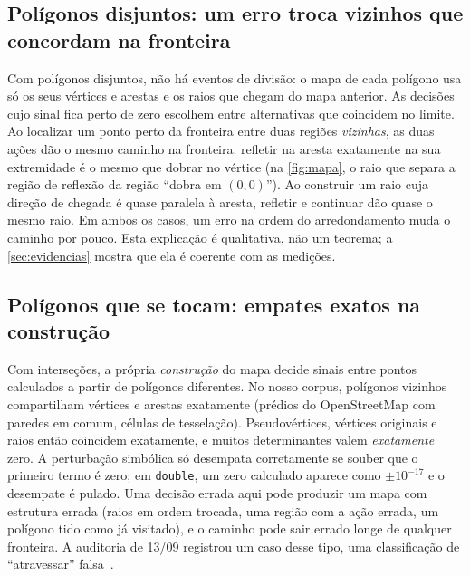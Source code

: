 \documentclass[11pt,a4paper]{article}
\theoremstyle{plain}\newtheorem{proposicao}{Proposição}
\theoremstyle{definition}\newtheorem{definicao}{Definição}
\theoremstyle{plain}\newtheorem{teorema}{Teorema}
\begin{document}
\subsection{Polígonos disjuntos: um erro troca vizinhos que concordam na fronteira}
Com polígonos disjuntos, não há eventos de divisão: o mapa de cada polígono usa só os seus vértices e arestas e os raios que chegam do mapa anterior. As decisões cujo sinal fica perto de zero escolhem entre alternativas que coincidem no limite. Ao localizar um ponto perto da fronteira entre duas regiões \emph{vizinhas}, as duas ações dão o mesmo caminho na fronteira: refletir na aresta exatamente na sua extremidade é o mesmo que dobrar no vértice (na \cref{fig:mapa}, o raio que separa a região de reflexão da região ``dobra em \((0,0)\)''). Ao construir um raio cuja direção de chegada é quase paralela à aresta, refletir e continuar dão quase o mesmo raio. Em ambos os casos, um erro na ordem do arredondamento muda o caminho por pouco. Esta explicação é qualitativa, não um teorema; a \cref{sec:evidencias} mostra que ela é coerente com as medições.

\subsection{Polígonos que se tocam: empates exatos na construção}
Com interseções, a própria \emph{construção} do mapa decide sinais entre pontos calculados a partir de polígonos diferentes. No nosso corpus, polígonos vizinhos compartilham vértices e arestas exatamente (prédios do OpenStreetMap com paredes em comum, células de tesselação). Pseudovértices, vértices originais e raios então coincidem exatamente, e muitos determinantes valem \emph{exatamente} zero. A perturbação simbólica só desempata corretamente se souber que o primeiro termo é zero; em \texttt{double}, um zero calculado aparece como \(\pm10^{-17}\) e o desempate é pulado. Uma decisão errada aqui pode produzir um mapa com estrutura errada (raios em ordem trocada, uma região com a ação errada, um polígono tido como já visitado), e o caminho pode sair errado longe de qualquer fronteira. A auditoria de 13/09 registrou um caso desse tipo, uma classificação de ``atravessar'' falsa~\cite{auditoria}.
\end{document}
